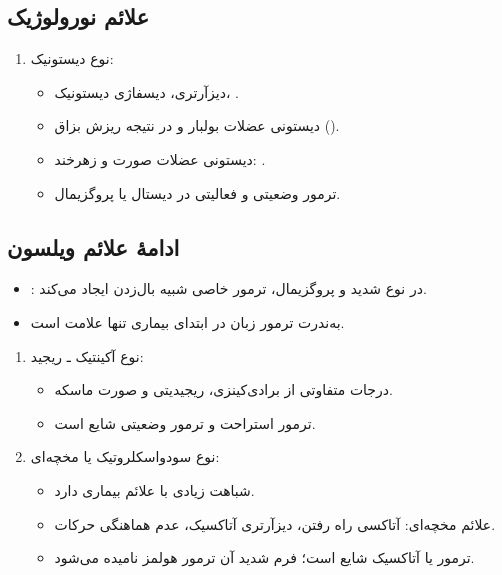 \documentclass[a4paper,12pt]{extbook}
\begin{document}
\subsection*{علائم نورولوژیک}
\begin{enumerate}[label=\alph*)]
\item نوع دیستونیک:
\begin{itemize}
\item دیزآرتری، دیسفاژی دیستونیک، .
\item دیستونی عضلات بولبار و در نتیجه ریزش بزاق ().
\item دیستونی عضلات صورت و زهرخند: .
\item ترمور وضعیتی و فعالیتی در دیستال یا پروگزیمال.
\end{itemize}
\end{enumerate}

\subsection*{ادامهٔ علائم ویلسون}
\begin{itemize}
\item {}: در نوع شدید و پروگزیمال، ترمور خاصی شبیه بال‌زدن ایجاد می‌کند.
\item به‌ندرت ترمور زبان در ابتدای بیماری تنها علامت است.
\end{itemize}
\begin{enumerate}[label=\alph*),start=2]
\item نوع آکینتیک ـ ریجید:
\begin{itemize}
\item درجات متفاوتی از برادی‌کینزی، ریجیدیتی و صورت ماسکه.
\item ترمور استراحت و ترمور وضعیتی شایع است.
\end{itemize}
\item نوع سودواسکلروتیک یا مخچه‌ای:
\begin{itemize}
\item شباهت زیادی با علائم بیماری  دارد.
\item علائم مخچه‌ای: آتاکسی راه رفتن، دیزآرتری آتاکسیک، عدم هماهنگی حرکات.
\item ترمور  یا آتاکسیک شایع است؛ فرم شدید آن ترمور هولمز نامیده می‌شود.
\end{itemize}
\end{enumerate}
\end{document}
